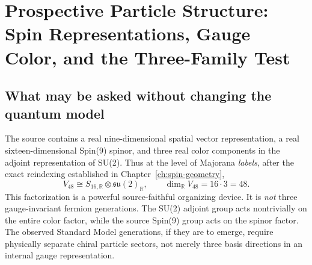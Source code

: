 \chapter[Representation Structure and Particle Families]{Prospective Particle Structure: Spin Representations, Gauge Color, and the Three-Family Test}
\label{ch:gut-representations}

\section{What may be asked without changing the quantum model}
The source contains a real nine-dimensional spatial vector
representation, a real sixteen-dimensional Spin(9) spinor, and
three real color components in the adjoint representation of SU(2).
Thus at the level of Majorana \emph{labels}, after the exact
reindexing established in Chapter~\ref{ch:spin-geometry},
\begin{equation}\label{eq:unification-labels}
 V_{48}\cong S_{16,\mathbb R}\otimes\mathfrak{su}(2)_{\mathbb R},
 \qquad \dim_{\mathbb R}V_{48}=16\cdot3=48.
\end{equation}
This factorization is a powerful source-faithful organizing device.
It is \emph{not} three gauge-invariant fermion generations. The
SU(2) adjoint group acts nontrivially on the entire color factor,
while the source Spin(9) group acts on the spinor factor. The
observed Standard Model generations, if they are to emerge, require
physically separate chiral particle sectors, not merely three
basis directions in an internal gauge representation.

